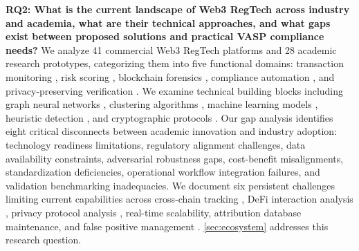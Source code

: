 \documentclass[conference,compsoc]{IEEEtran}
\begin{document}
\noindent\textbf{RQ2: What is the current landscape of Web3 RegTech across industry and academia, what are their technical approaches, and what gaps exist between proposed solutions and practical VASP compliance needs?}
We analyze 41 commercial Web3 RegTech platforms and 28 academic research prototypes, categorizing them into five functional domains: transaction monitoring \cite{weber2019antimoneylaunderingbitcoin,petterssonruiz2022combatingmoneylaundering}, risk scoring \cite{moser2014riskscoringbitcoin,monamo2016unsupervisedlearningrobust}, blockchain forensics \cite{meiklejohn2013fistfulbitcoinscharacterizing,yousaf2019tracingtransactionscryptocurrency}, compliance automation \cite{charoenwong2024regtechtechnologydrivencompliance}, and privacy-preserving verification \cite{ben-sasson2017scalablezeroknowledge,yang2024researchidentitydata}. We examine technical building blocks including graph neural networks \cite{wu2023tracerscalablegraphbased,azad2025machinelearningblockchain,asiri2025graphconvolutionnetwork,zhang2024graphnetworkmodels}, clustering algorithms \cite{reid2013analysisanonymitybitcoin,ron2013quantitativeanalysisfull}, machine learning models \cite{pourhabibi2020frauddetectionsystematic,rodriguezvalencia2025systematicreviewartificial}, heuristic detection \cite{difrancescomaesa2018datadrivenanalysisbitcoin}, and cryptographic protocols \cite{zhang2024blockchainzeroknowledge,camenisch2001efficientsystemnontransferable}. Our gap analysis identifies eight critical disconnects between academic innovation and industry adoption: technology readiness limitations, regulatory alignment challenges, data availability constraints, adversarial robustness gaps, cost-benefit misalignments, standardization deficiencies, operational workflow integration failures, and validation benchmarking inadequacies. We document six persistent challenges limiting current capabilities across cross-chain tracking \cite{zamyatin2021sokcommunicationdistributed,lin2024crosschainabnormaltransaction}, DeFi interaction analysis \cite{qin2021attackingdefiecosystem,sun2025ethereumfrauddetection}, privacy protocol analysis \cite{kappos2018empiricalanalysisanonymity,kumar2017traceabilityanalysismoneros}, real-time scalability, attribution database maintenance, and false positive management \cite{alotibi2022moneylaunderingdetection}. \autoref{sec:ecosystem} addresses this research question.
\end{document}
